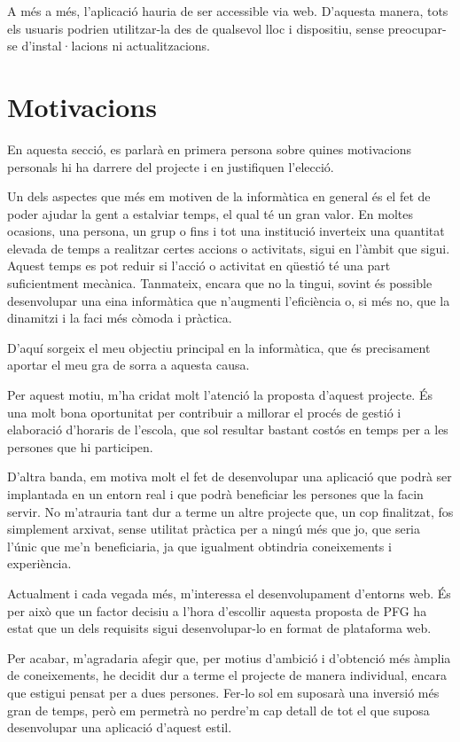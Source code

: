 \documentclass[a4paper,12pt]{ThesisStyle}
\begin{document}
A més a més, l'aplicació hauria de ser accessible via web. D'aquesta manera, tots els usuaris podrien utilitzar-la des de qualsevol lloc i dispositiu, sense preocupar-se d'instal·lacions ni actualitzacions.

\section{Motivacions}
\label{sec:motivacions}

En aquesta secció, es parlarà en primera persona sobre quines motivacions personals hi ha darrere del projecte i en justifiquen l'elecció.

Un dels aspectes que més em motiven de la informàtica en general és el fet de poder ajudar la gent a estalviar temps, el qual té un gran valor. En moltes ocasions, una persona, un grup o fins i tot una institució inverteix una quantitat elevada de temps a realitzar certes accions o activitats, sigui en l'àmbit que sigui. Aquest temps es pot reduir si l'acció o activitat en qüestió té una part suficientment mecànica. Tanmateix, encara que no la tingui, sovint és possible desenvolupar una eina informàtica que n'augmenti l'eficiència o, si més no, que la dinamitzi i la faci més còmoda i pràctica.

D'aquí sorgeix el meu objectiu principal en la informàtica, que és precisament aportar el meu gra de sorra a aquesta causa.

Per aquest motiu, m'ha cridat molt l'atenció la proposta d'aquest projecte. És una molt bona oportunitat per contribuir a millorar el procés de gestió i elaboració d'horaris de l'escola, que sol resultar bastant costós en temps per a les persones que hi participen.

D'altra banda, em motiva molt el fet de desenvolupar una aplicació que podrà ser implantada en un entorn real i que podrà beneficiar les persones que la facin servir. No m'atrauria tant dur a terme un altre projecte que, un cop finalitzat, fos simplement arxivat, sense utilitat pràctica per a ningú més que jo, que seria l'únic que me'n beneficiaria, ja que igualment obtindria coneixements i experiència.

Actualment i cada vegada més, m'interessa el desenvolupament d'entorns web. És per això que un factor decisiu a l'hora d'escollir aquesta proposta de PFG ha estat que un dels requisits sigui desenvolupar-lo en format de plataforma web.

Per acabar, m'agradaria afegir que, per motius d'ambició i d'obtenció més àmplia de coneixements, he decidit dur a terme el projecte de manera individual, encara que estigui pensat per a dues persones. Fer-lo sol em suposarà una inversió més gran de temps, però em permetrà no perdre'm cap detall de tot el que suposa desenvolupar una aplicació d'aquest estil.
\end{document}
